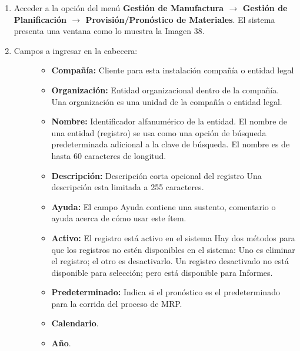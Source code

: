 \documentclass[letterpaper,10pt,spanish]{sphinxmanual}
\begin{document}
\begin{enumerate}
\item {} 
Acceder a la opción del menú \textbf{Gestión de Manufactura \(\rightarrow\)  Gestión de Planificación \(\rightarrow\) Provisión/Pronóstico de Materiales}. El sistema presenta una ventana como lo muestra la Imagen 38.

\item {} \begin{description}
\item[{Campos a ingresar en la cabecera:}] \leavevmode\begin{itemize}
\item {} 
\textbf{Compañía:} Cliente para esta instalación compañía o entidad legal

\item {} 
\textbf{Organización:} Entidad organizacional dentro de la compañía. Una organización es una unidad de la compañía o entidad legal.

\item {} 
\textbf{Nombre:} Identificador alfanumérico de la entidad. El nombre de una entidad (registro) se usa como una opción de búsqueda predeterminada adicional a la clave de búsqueda. El nombre es de hasta 60 caracteres de longitud.

\item {} 
\textbf{Descripción:} Descripción corta opcional del registro Una descripción esta limitada a 255 caracteres.

\item {} 
\textbf{Ayuda:} El campo Ayuda contiene una sustento, comentario o ayuda acerca de cómo usar este ítem.

\item {} 
\textbf{Activo:} El registro está activo en el sistema Hay dos métodos para que los registros no estén disponibles en el sistema: Uno es eliminar el registro; el otro es desactivarlo. Un registro desactivado no está disponible para selección; pero está disponible para Informes.

\item {} 
\textbf{Predeterminado:} Indica si el pronóstico es el predeterminado para la corrida del proceso de MRP.

\item {} 
\textbf{Calendario}.

\item {} 
\textbf{Año}.

\end{itemize}


\end{description}
\end{enumerate}
\end{document}
